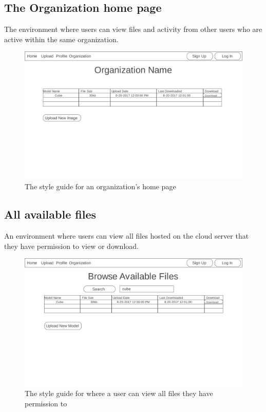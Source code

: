 \subsection{The Organization home page}
    \hspace{7mm}
    The environment where users can view files and activity from other users who are
    active within the same organization.
    \ \\
    \label{fig:proto_web_organization_home}
    \begin{figure}[H]
        \centering \includegraphics[width=0.6\linewidth]{Organization}
        \caption{The style guide for an organization's home page}
    \end{figure}

\subsection{All available files}
    \hspace{7mm}
    An environment where users can view all files hosted on the cloud server that
    they have permission to view or download.
    \ \\
    \label{fig:proto_web_browse_all_files}
    \begin{figure}[H]
        \centering \includegraphics[width=0.6\linewidth]{All}
        \caption{The style guide for where a user can view all files they have permission to}
    \end{figure}
